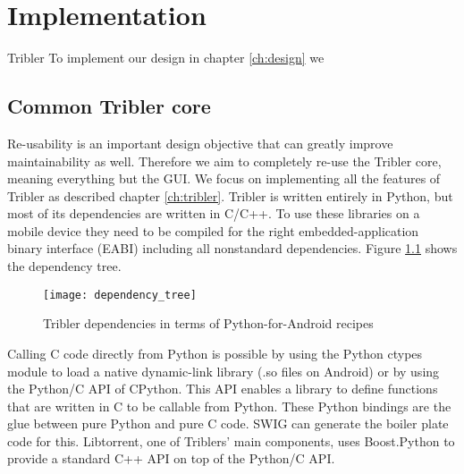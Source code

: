 \chapter{Implementation}
\label{ch:implementation}

Tribler 
To implement our design in chapter \ref{ch:design} we

\section{Common Tribler core}
Re-usability is an important design objective that can greatly improve maintainability as well.
Therefore we aim to completely re-use the Tribler core, meaning everything but the GUI.
We focus on implementing all the features of Tribler as described chapter \ref{ch:tribler}.
Tribler is written entirely in Python, but most of its dependencies are written in C/C++.
To use these libraries on a mobile device they need to be compiled for the right embedded-application binary interface (EABI) including all nonstandard dependencies.
Figure \ref{fig:dependency_tree} shows the dependency tree.

\begin{figure}
	\centering
	\texttt{[image: dependency\_tree]}
	\caption{Tribler dependencies in terms of Python-for-Android recipes}
	\label{fig:dependency_tree}
\end{figure}

Calling C code directly from Python is possible by using the Python ctypes module to load a native dynamic-link library (.so files on Android) or by using the Python/C API of CPython.
This API enables a library to define functions that are written in C to be callable from Python.
These Python bindings are the glue between pure Python and pure C code.
SWIG can generate the boiler plate code for this.
Libtorrent, one of Triblers' main components, uses Boost.Python to provide a standard C++ API on top of the Python/C API.


